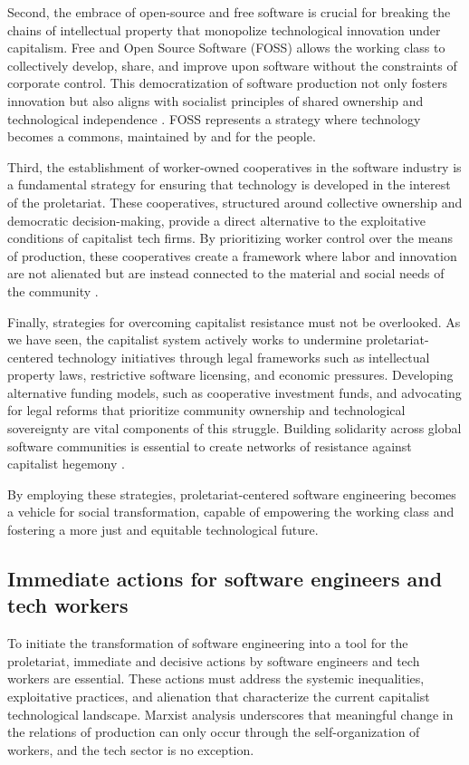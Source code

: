 \begin{refsection}
Second, the embrace of open-source and free software is crucial for breaking the chains of intellectual property that monopolize technological innovation under capitalism. Free and Open Source Software (FOSS) allows the working class to collectively develop, share, and improve upon software without the constraints of corporate control. This democratization of software production not only fosters innovation but also aligns with socialist principles of shared ownership and technological independence \cite[pp.~101-104]{perens1999}. FOSS represents a strategy where technology becomes a commons, maintained by and for the people.

Third, the establishment of worker-owned cooperatives in the software industry is a fundamental strategy for ensuring that technology is developed in the interest of the proletariat. These cooperatives, structured around collective ownership and democratic decision-making, provide a direct alternative to the exploitative conditions of capitalist tech firms. By prioritizing worker control over the means of production, these cooperatives create a framework where labor and innovation are not alienated but are instead connected to the material and social needs of the community \cite[pp.~140-143]{scholz2016}.

Finally, strategies for overcoming capitalist resistance must not be overlooked. As we have seen, the capitalist system actively works to undermine proletariat-centered technology initiatives through legal frameworks such as intellectual property laws, restrictive software licensing, and economic pressures. Developing alternative funding models, such as cooperative investment funds, and advocating for legal reforms that prioritize community ownership and technological sovereignty are vital components of this struggle. Building solidarity across global software communities is essential to create networks of resistance against capitalist hegemony \cite[pp.~197-200]{schwab2020}.

By employing these strategies, proletariat-centered software engineering becomes a vehicle for social transformation, capable of empowering the working class and fostering a more just and equitable technological future.

\subsection{Immediate actions for software engineers and tech workers}

To initiate the transformation of software engineering into a tool for the proletariat, immediate and decisive actions by software engineers and tech workers are essential. These actions must address the systemic inequalities, exploitative practices, and alienation that characterize the current capitalist technological landscape. Marxist analysis underscores that meaningful change in the relations of production can only occur through the self-organization of workers, and the tech sector is no exception.


\end{refsection}
